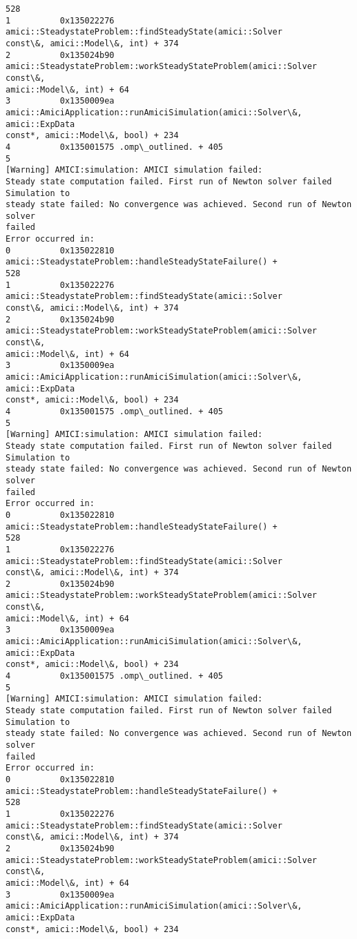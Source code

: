 \documentclass[11pt]{article}
\begin{document}
\begin{Verbatim}[commandchars=\\\{\}]
528
1          0x135022276 amici::SteadystateProblem::findSteadyState(amici::Solver
const\&, amici::Model\&, int) + 374
2          0x135024b90
amici::SteadystateProblem::workSteadyStateProblem(amici::Solver const\&,
amici::Model\&, int) + 64
3          0x1350009ea
amici::AmiciApplication::runAmiciSimulation(amici::Solver\&, amici::ExpData
const*, amici::Model\&, bool) + 234
4          0x135001575 .omp\_outlined. + 405
5
[Warning] AMICI:simulation: AMICI simulation failed:
Steady state computation failed. First run of Newton solver failed Simulation to
steady state failed: No convergence was achieved. Second run of Newton solver
failed
Error occurred in:
0          0x135022810 amici::SteadystateProblem::handleSteadyStateFailure() +
528
1          0x135022276 amici::SteadystateProblem::findSteadyState(amici::Solver
const\&, amici::Model\&, int) + 374
2          0x135024b90
amici::SteadystateProblem::workSteadyStateProblem(amici::Solver const\&,
amici::Model\&, int) + 64
3          0x1350009ea
amici::AmiciApplication::runAmiciSimulation(amici::Solver\&, amici::ExpData
const*, amici::Model\&, bool) + 234
4          0x135001575 .omp\_outlined. + 405
5
[Warning] AMICI:simulation: AMICI simulation failed:
Steady state computation failed. First run of Newton solver failed Simulation to
steady state failed: No convergence was achieved. Second run of Newton solver
failed
Error occurred in:
0          0x135022810 amici::SteadystateProblem::handleSteadyStateFailure() +
528
1          0x135022276 amici::SteadystateProblem::findSteadyState(amici::Solver
const\&, amici::Model\&, int) + 374
2          0x135024b90
amici::SteadystateProblem::workSteadyStateProblem(amici::Solver const\&,
amici::Model\&, int) + 64
3          0x1350009ea
amici::AmiciApplication::runAmiciSimulation(amici::Solver\&, amici::ExpData
const*, amici::Model\&, bool) + 234
4          0x135001575 .omp\_outlined. + 405
5
[Warning] AMICI:simulation: AMICI simulation failed:
Steady state computation failed. First run of Newton solver failed Simulation to
steady state failed: No convergence was achieved. Second run of Newton solver
failed
Error occurred in:
0          0x135022810 amici::SteadystateProblem::handleSteadyStateFailure() +
528
1          0x135022276 amici::SteadystateProblem::findSteadyState(amici::Solver
const\&, amici::Model\&, int) + 374
2          0x135024b90
amici::SteadystateProblem::workSteadyStateProblem(amici::Solver const\&,
amici::Model\&, int) + 64
3          0x1350009ea
amici::AmiciApplication::runAmiciSimulation(amici::Solver\&, amici::ExpData
const*, amici::Model\&, bool) + 234

\end{Verbatim}
\end{document}
